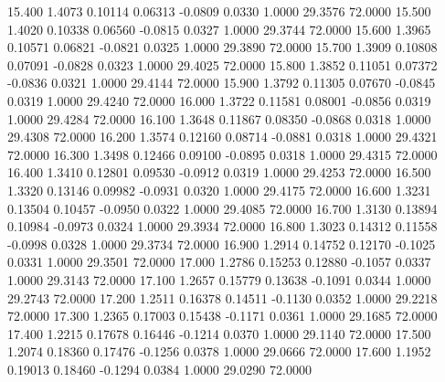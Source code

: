   15.400   1.4073   0.10114   0.06313  -0.0809   0.0330   1.0000  29.3576  72.0000
  15.500   1.4020   0.10338   0.06560  -0.0815   0.0327   1.0000  29.3744  72.0000
  15.600   1.3965   0.10571   0.06821  -0.0821   0.0325   1.0000  29.3890  72.0000
  15.700   1.3909   0.10808   0.07091  -0.0828   0.0323   1.0000  29.4025  72.0000
  15.800   1.3852   0.11051   0.07372  -0.0836   0.0321   1.0000  29.4144  72.0000
  15.900   1.3792   0.11305   0.07670  -0.0845   0.0319   1.0000  29.4240  72.0000
  16.000   1.3722   0.11581   0.08001  -0.0856   0.0319   1.0000  29.4284  72.0000
  16.100   1.3648   0.11867   0.08350  -0.0868   0.0318   1.0000  29.4308  72.0000
  16.200   1.3574   0.12160   0.08714  -0.0881   0.0318   1.0000  29.4321  72.0000
  16.300   1.3498   0.12466   0.09100  -0.0895   0.0318   1.0000  29.4315  72.0000
  16.400   1.3410   0.12801   0.09530  -0.0912   0.0319   1.0000  29.4253  72.0000
  16.500   1.3320   0.13146   0.09982  -0.0931   0.0320   1.0000  29.4175  72.0000
  16.600   1.3231   0.13504   0.10457  -0.0950   0.0322   1.0000  29.4085  72.0000
  16.700   1.3130   0.13894   0.10984  -0.0973   0.0324   1.0000  29.3934  72.0000
  16.800   1.3023   0.14312   0.11558  -0.0998   0.0328   1.0000  29.3734  72.0000
  16.900   1.2914   0.14752   0.12170  -0.1025   0.0331   1.0000  29.3501  72.0000
  17.000   1.2786   0.15253   0.12880  -0.1057   0.0337   1.0000  29.3143  72.0000
  17.100   1.2657   0.15779   0.13638  -0.1091   0.0344   1.0000  29.2743  72.0000
  17.200   1.2511   0.16378   0.14511  -0.1130   0.0352   1.0000  29.2218  72.0000
  17.300   1.2365   0.17003   0.15438  -0.1171   0.0361   1.0000  29.1685  72.0000
  17.400   1.2215   0.17678   0.16446  -0.1214   0.0370   1.0000  29.1140  72.0000
  17.500   1.2074   0.18360   0.17476  -0.1256   0.0378   1.0000  29.0666  72.0000
  17.600   1.1952   0.19013   0.18460  -0.1294   0.0384   1.0000  29.0290  72.0000
